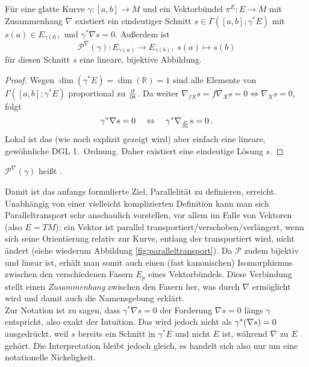 \begin{satz}
Für eine glatte Kurve $\gamma: [a, b] \rightarrow M$ und ein Vektorbündel $\pi^E: E \rightarrow M$ mit Zusammenhang $\nabla$ existiert ein eindeutiger Schnitt $s \in \Gamma([a, b]; \gamma^* E)$ mit
$s(a) \in E_{\gamma(0)}$ und $\gamma^* \nabla s = 0$. Außerdem ist
\begin{equation}
\mathcal{P}^\nabla(\gamma): E_{\gamma(a)} \rightarrow E_{\gamma(b)}, \; s(a) \mapsto s(b)
\end{equation}
für diesen Schnitt $s$ eine lineare, bijektive Abbildung.
\end{satz}

\begin{proof}
Wegen $\dim(\gamma^* E) = \dim(\mathbb{R}) = 1$ sind alle Elemente von $\Gamma([a, b]; \gamma^* E)$ proportional zu $\pdv{t}$. Da weiter $\nabla_{f X} s = f \nabla_X s = 0 \Leftrightarrow \nabla_X s = 0$, folgt
\begin{equation*}
\gamma^* \nabla s = 0 \quad \Leftrightarrow \quad \gamma^* \nabla_{\pdv{t}} s = 0 \, .
\end{equation*}
Lokal ist das (wie noch explizit gezeigt wird) aber einfach eine lineare, gewöhnliche DGL 1.~Ordnung. Daher existiert eine eindeutige Lösung $s$.
\end{proof}

\begin{defi}[Paralleltransport]
$\mathcal{P}^\nabla(\gamma)$ heißt .
\end{defi}

Damit ist das anfangs formulierte Ziel, Parallelität zu definieren, erreicht. Unabhängig von einer vielleicht komplizierten Definition kann man sich Paralleltransport sehr anschaulich vorstellen, vor allem im Falle von Vektoren (also $E = TM$): ein Vektor ist parallel transportiert/verschoben/verlängert, wenn sich seine Orientierung relativ zur Kurve, entlang der transportiert wird, nicht ändert (siehe wiederum Abbildung \ref{fig:paralleltransport}). Da $\mathcal{P}$ zudem bijektiv und linear ist, erhält man somit auch einen (fast kanonischen) Isomorphismus zwischen den verschiedenen Fasern $E_p$ eines Vektorbündels. Diese Verbindung stellt einen \emph{Zusammenhang} zwischen den Fasern her, was durch $\nabla$ ermöglicht wird und damit auch die Namensgebung erklärt.\\


Zur Notation ist zu sagen, dass $\gamma^* \nabla s = 0$ der Forderung $\nabla s = 0$ längs $\gamma$ entspricht, also exakt der Intuition. Das wird jedoch nicht als $\gamma^*\qty(\nabla s) = 0$ ausgedrückt, weil $s$ bereits ein Schnitt in $\gamma^* E$ und nicht $E$ ist, während $\nabla$ zu $E$ gehört. Die Interpretation bleibt jedoch gleich, es handelt sich also nur um eine notationelle Nickeligkeit.



